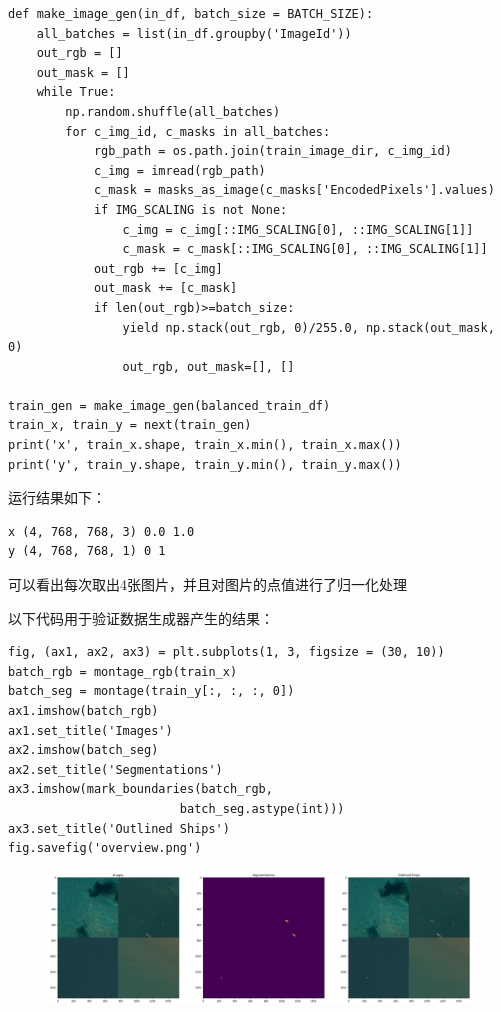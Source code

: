 \begin{verbatim}
def make_image_gen(in_df, batch_size = BATCH_SIZE):
    all_batches = list(in_df.groupby('ImageId'))
    out_rgb = []
    out_mask = []
    while True:
        np.random.shuffle(all_batches)
        for c_img_id, c_masks in all_batches:
            rgb_path = os.path.join(train_image_dir, c_img_id)
            c_img = imread(rgb_path)
            c_mask = masks_as_image(c_masks['EncodedPixels'].values)
            if IMG_SCALING is not None:
                c_img = c_img[::IMG_SCALING[0], ::IMG_SCALING[1]]
                c_mask = c_mask[::IMG_SCALING[0], ::IMG_SCALING[1]]
            out_rgb += [c_img]
            out_mask += [c_mask]
            if len(out_rgb)>=batch_size:
                yield np.stack(out_rgb, 0)/255.0, np.stack(out_mask, 0)
                out_rgb, out_mask=[], []

train_gen = make_image_gen(balanced_train_df)
train_x, train_y = next(train_gen)
print('x', train_x.shape, train_x.min(), train_x.max())
print('y', train_y.shape, train_y.min(), train_y.max())
\end{verbatim}

运行结果如下：

\begin{verbatim}
x (4, 768, 768, 3) 0.0 1.0
y (4, 768, 768, 1) 0 1
\end{verbatim}

可以看出每次取出4张图片，并且对图片的点值进行了归一化处理

以下代码用于验证数据生成器产生的结果：

\begin{verbatim}
fig, (ax1, ax2, ax3) = plt.subplots(1, 3, figsize = (30, 10))
batch_rgb = montage_rgb(train_x)
batch_seg = montage(train_y[:, :, :, 0])
ax1.imshow(batch_rgb)
ax1.set_title('Images')
ax2.imshow(batch_seg)
ax2.set_title('Segmentations')
ax3.imshow(mark_boundaries(batch_rgb, 
                        batch_seg.astype(int)))
ax3.set_title('Outlined Ships')
fig.savefig('overview.png')
\end{verbatim}

\begin{figure}
\centering
\includegraphics{preprocessing_pic/6.png}
\caption{}
\end{figure}


